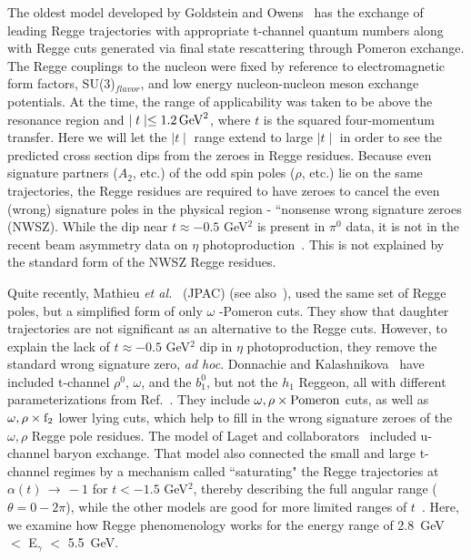 \documentclass[aps,prc,twocolumn,floatfix,showpacs,preprintnumbers,amsmath,amssymb,superscriptaddress,linenumbers]{revtex4-1}
\begin{document}
The oldest model developed by Goldstein and 
Owens~\cite{Goldstein:1973xn} has the exchange of leading Regge 
trajectories with appropriate t-channel quantum numbers along with 
Regge cuts generated via final state rescattering through Pomeron 
exchange. The Regge couplings to the nucleon were fixed by reference 
to electromagnetic form factors, SU(3)$_{flavor}$, and low energy 
nucleon-nucleon meson exchange potentials. At the time, the range of 
applicability was taken to be above the resonance region and $\mid 
t \mid \le 1.2 \, {\rm GeV}^2$, where $t$ is the squared 
four-momentum transfer. Here we will let the $\mid t \mid$ 
range extend to large $\mid t \mid$ in order to see the predicted cross 
section dips from the zeroes in Regge residues. Because even signature partners ($A_2$, etc.) of the odd spin poles ($\rho$, etc.) lie on the same trajectories, the Regge residues are required to have zeroes to cancel the even (wrong) signature poles in the physical region - “nonsense wrong signature zeroes (NWSZ). While the dip near 
$t\approx -0.5$ GeV$^2$ is present in $\pi^0$ data, it is not in the 
recent beam asymmetry data on $\eta$ 
photoproduction~\cite{AlGhoul:2017nbp}. This is not explained by the 
standard form of the NWSZ Regge residues. 
  
Quite recently, Mathieu {\it et al.}~\cite{Mathieu:2015eia} (JPAC) 
(see also~\cite{Kashevarov:2017vyl}), used the same set of Regge poles, 
but a simplified form of only $\omega$ -Pomeron cuts. They show that 
daughter trajectories are not significant as an alternative to the 
Regge cuts. However, to explain the lack of $t\approx -0.5$ GeV$^2$ 
dip in $\eta$ photoproduction, they remove the standard wrong signature 
zero, {\it ad hoc}.  Donnachie and Kalashnikova~\cite{Donnachie:2015jaa} 
have included t-channel $\rho^0$, $\omega$, and the $b^0_1$, but not 
the $h_1$ Reggeon, all with different parameterizations from 
Ref.~\cite{Goldstein:1973xn}. They include $\omega, \rho \times {\rm 
Pomeron}$ cuts, as well as $\omega, \rho \times {\rm f}_2$ lower lying 
cuts, which help to fill in the wrong signature zeroes of the $\omega, 
\rho$ Regge pole residues. The model of Laget and 
collaborators~\cite{Laget:2005be} included u-channel baryon exchange. 
That model also connected the small and large t-channel regimes by a 
mechanism called ``saturating" the Regge trajectories at $\alpha(t) \, 
\rightarrow \, -1$ for $t < -1.5$ GeV$^2$, thereby describing the full 
angular range ($\theta = 0 - 2\pi$), while the other models are good 
for more limited ranges of $t$~\cite{Goldstein:1973xn,Mathieu:2015eia,
Donnachie:2015jaa}. Here, we examine how Regge phenomenology works for 
the energy range of 2.8~GeV $< $ E$_\gamma$ $<$ 5.5~GeV.
\end{document}
